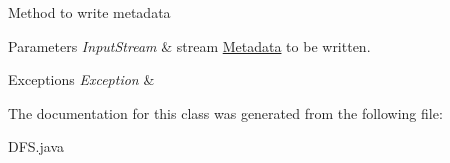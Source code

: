 Method to write metadata 
\begin{DoxyParams}{Parameters}
{\em Input\+Stream} & stream \hyperlink{class_metadata}{Metadata} to be written. \\
\hline
\end{DoxyParams}

\begin{DoxyExceptions}{Exceptions}
{\em Exception} & \\
\hline
\end{DoxyExceptions}


The documentation for this class was generated from the following file\+:\begin{DoxyCompactItemize}
\item 
D\+F\+S.\+java\end{DoxyCompactItemize}
